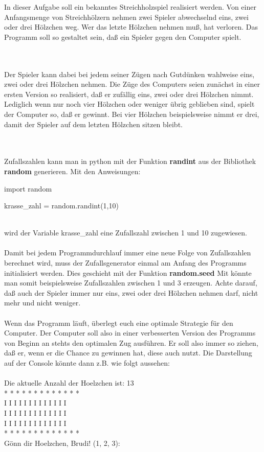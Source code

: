 \documentclass{article}%
\begin{document}
In dieser Aufgabe soll ein bekanntes Streichholzspiel realisiert werden. Von einer Anfangsmenge von Streichhölzern nehmen zwei Spieler abwechselnd eins, zwei oder drei Hölzchen weg. Wer das
letzte Hölzchen nehmen muß, hat verloren. Das Programm soll so gestaltet sein, daß ein Spieler gegen den Computer spielt.

\ \\ \\Der Spieler kann dabei bei jedem seiner Zügen nach Gutdünken wahlweise eins, zwei oder drei Hölzchen nehmen. Die Züge des Computers seien zunächst in einer ersten Version so realisiert, daß er zufällig eins, zwei oder drei Hölzchen nimmt.
Lediglich wenn nur noch vier Hölzchen oder weniger übrig geblieben sind, spielt der Computer so, daß er gewinnt.
Bei vier Hölzchen beispielsweise nimmt er drei, damit der Spieler auf dem letzten Hölzchen sitzen bleibt. 

\ \\ \\Zufallszahlen kann man in python mit der Funktion \textbf{randint} aus der Bibliothek \textbf{random} generieren. Mit den Anweisungen:
\begin{python}
import random

krasse_zahl = random.randint(1,10)
\end{python}
\ \\wird der Variable krasse\_zahl eine Zufallszahl zwischen 1 und 10 zugewiesen. \ \\\\Damit bei jedem Programmdurchlauf immer eine neue Folge von Zufallszahlen berechnet wird, muss der Zufallsgenerator einmal am Anfang des Programms initialisiert werden. Dies geschieht mit der Funktion \textbf{random.seed} 
Mit könnte man somit beispielsweise Zufallszahlen zwischen 1 und 3 erzeugen. Achte darauf, daß
auch der Spieler immer nur eins, zwei oder drei Hölzchen nehmen darf, nicht mehr und nicht weniger. 
\ \\\\
Wenn das Programm läuft, überlegt euch eine optimale Strategie für den Computer. Der Computer soll also in einer verbesserten Version des Programms von
Beginn an stehts den optimalen Zug ausführen. Er soll also immer so ziehen, daß er, wenn er die
Chance zu gewinnen hat, diese auch nutzt.
Die Darstellung auf der Console könnte dann z.B. wie folgt aussehen:
\ \\\\
Die aktuelle Anzahl der Hoelzchen ist: 13
\ \\* * * * * * * * * * * * *
\ \\I I I I I I I I I I I I I
\ \\I I I I I I I I I I I I I
\ \\I I I I I I I I I I I I I
\ \\* * * * * * * * * * * * *
\ \\Gönn dir Hoelzchen, Brudi! (1, 2, 3):
\end{document}
